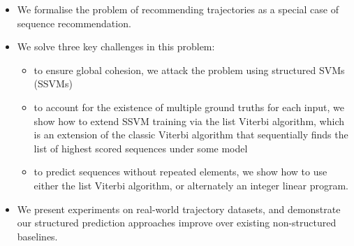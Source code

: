 \begin{itemize}[noitemsep,leftmargin=12pt]%
    \item We formalise the problem of recommending trajectories as a special case of sequence recommendation.          

	\item We solve three key challenges in this problem:
	\begin{itemize}
		\item to ensure global cohesion, we attack the problem using structured SVMs (SSVMs)
		\item to account for the existence of multiple ground truths for each input, we show how
		to extend SSVM training via the list Viterbi algorithm, 
        which is an extension of the classic Viterbi algorithm that sequentially finds the list of highest scored sequences under some model
		\item to predict sequences without repeated elements, we show how to use either the list Viterbi algorithm, or alternately an integer linear program.
	\end{itemize}

	\item We present experiments on real-world trajectory datasets, and demonstrate our structured prediction approaches improve over existing non-structured baselines. %





\end{itemize}
